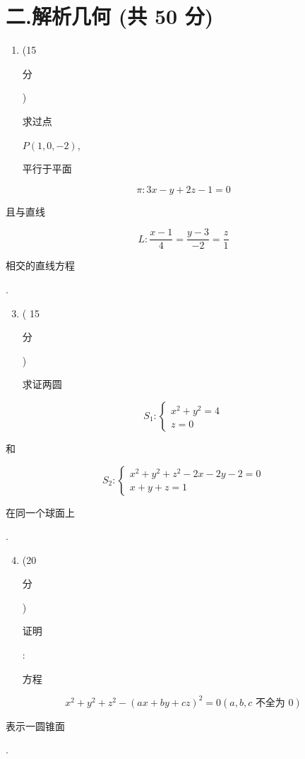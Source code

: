 \documentclass[10pt]{article}
\begin{document}
\section{二.解析几何 (共 50 分)}
\begin{enumerate}
  \item (15 \begin{CJK}{UTF8}{mj}分\end{CJK}) \begin{CJK}{UTF8}{mj}求过点\end{CJK} $P(1,0,-2)$, \begin{CJK}{UTF8}{mj}平行于平面\end{CJK}
\end{enumerate}
$$
\pi: 3 x-y+2 z-1=0
$$
\begin{CJK}{UTF8}{mj}且与直线\end{CJK}
$$
L: \frac{x-1}{4}=\frac{y-3}{-2}=\frac{z}{1}
$$
\begin{CJK}{UTF8}{mj}相交的直线方程\end{CJK}.

\begin{enumerate}
  \setcounter{enumi}{2}
  \item ( 15 \begin{CJK}{UTF8}{mj}分\end{CJK}) \begin{CJK}{UTF8}{mj}求证两圆\end{CJK}
\end{enumerate}
$$
S_{1}:\left\{\begin{array}{l}
x^{2}+y^{2}=4 \\
z=0
\end{array}\right.
$$
\begin{CJK}{UTF8}{mj}和\end{CJK}
$$
S_{2}:\left\{\begin{array}{l}
x^{2}+y^{2}+z^{2}-2 x-2 y-2=0 \\
x+y+z=1
\end{array}\right.
$$
\begin{CJK}{UTF8}{mj}在同一个球面上\end{CJK}.

\begin{enumerate}
  \setcounter{enumi}{3}
  \item (20 \begin{CJK}{UTF8}{mj}分\end{CJK}) \begin{CJK}{UTF8}{mj}证明\end{CJK}: \begin{CJK}{UTF8}{mj}方程\end{CJK}
\end{enumerate}
$$
x^{2}+y^{2}+z^{2}-(a x+b y+c z)^{2}=0(a, b, c \text { 不全为 } 0)
$$
\begin{CJK}{UTF8}{mj}表示一圆锥面\end{CJK}.
\end{document}
